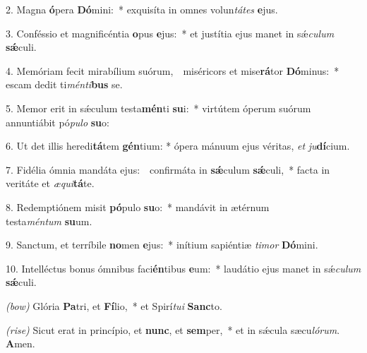 2. Magna \textbf{ó}pera \textbf{Dó}mini:~*
	exquisíta in omnes volun\textit{tá}\textit{tes} \textbf{e}jus.

3. Conféssio et magnificéntia \textbf{o}pus \textbf{e}jus:~*
	et justítia ejus manet in s\'{\ae}\textit{cu}\textit{lum} \textbf{s\'{\ae}}culi.

4. Memóriam fecit mirabílium suórum,~{\color{red}\GreDagger}\
	miséricors et mise\textbf{rá}tor \textbf{Dó}minus:~*
	escam dedit ti\textit{mén}\textit{ti}\textbf{bus} se.

5. Memor erit in s\'{\ae}culum testa\textbf{mén}ti \textbf{su}i:~*
	virtútem óperum suórum annuntiábit pó\textit{pu}\textit{lo} \textbf{su}o:

6. Ut det illis heredi\textbf{tá}tem \textbf{gén}tium: *
	ópera mánuum ejus véritas, \textit{et} \textit{ju}\textbf{dí}\-cium.

7. Fidélia ómnia mandáta ejus:~{\color{red}\GreDagger}\
	confirmáta in \textbf{s\'{\ae}}culum \textbf{s\'{\ae}}culi,~*
	facta in veritáte et \textit{æ}\textit{qui}\textbf{tá}te.

8. Redemptiónem misit \textbf{pó}pulo \textbf{su}o:~*
	mandávit in ætérnum\\ testa\textit{mén}\textit{tum} \textbf{su}um.

9. Sanctum, et terríbile \textbf{no}men \textbf{e}jus:~*
	inítium sapiéntiæ \textit{ti}\textit{mor} \textbf{Dó}\-mini.

10. Intelléctus bonus ómnibus faci\textbf{én}tibus \textbf{e}um:~*
	laudátio ejus manet in s\'{\ae}\textit{cu}\textit{lum} \textbf{s\'{\ae}}culi.

{\color{red}\textit{(bow)}} Glória \textbf{Pa}tri, et \textbf{Fí}lio,~*
	et Spirí\textit{tu}\textit{i} \textbf{Sanc}to.

{\color{red}\textit{(rise)}} Sicut erat in princípio, et \textbf{nunc}, et \textbf{sem}per,~*
	et in s\'{\ae}cula sæcu\textit{ló}\textit{rum}. \textbf{A}men.